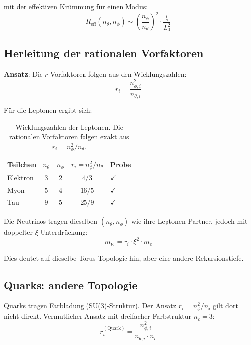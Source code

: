 mit der effektiven Krümmung für einen Modus:
\begin{equation}
    R_{\mathrm{eff}}(n_\theta, n_\phi)
    \sim \left(\frac{n_\phi}{n_\theta}\right)^2 \cdot \frac{\xi}{L_0^2}
\end{equation}

\subsection{Herleitung der rationalen Vorfaktoren}

\textbf{Ansatz}: Die $r$-Vorfaktoren folgen aus den Wicklungszahlen:
\begin{equation}
    \boxed{r_i = \frac{n_{\phi,i}^2}{n_{\theta,i}}}
    \label{eq:r_winding}
\end{equation}

Für die Leptonen ergibt sich:

\begin{table}[htbp]
\centering
\begin{tabular}{lcccl}
\toprule
\textbf{Teilchen} & $n_\theta$ & $n_\phi$ & $r_i = n_\phi^2/n_\theta$
& \textbf{Probe} \\
\midrule
Elektron & $3$ & $2$ & $4/3$  & $\checkmark$ \\
Myon     & $5$ & $4$ & $16/5$ & $\checkmark$ \\
Tau      & $9$ & $5$ & $25/9$ & $\checkmark$ \\
\bottomrule
\end{tabular}
\caption{Wicklungszahlen der Leptonen. Die rationalen Vorfaktoren folgen
exakt aus $r_i = n_\phi^2 / n_\theta$.}
\label{tab:leptonen_wicklung}
\end{table}

Die Neutrinos tragen dieselben $(n_\theta, n_\phi)$ wie ihre
Leptonen-Partner, jedoch mit doppelter $\xi$-Unterdrückung:
\begin{equation}
    m_{\nu_i} = r_i \cdot \xi^2 \cdot m_e
\end{equation}

Dies deutet auf dieselbe Torus-Topologie hin, aber eine andere
Rekursionstiefe.

\subsection{Quarks: andere Topologie}

Quarks tragen Farbladung (SU(3)-Struktur). Der Ansatz
$r_i = n_\phi^2 / n_\theta$ gilt dort nicht direkt. Vermutlicher
Ansatz mit dreifacher Farbstruktur $n_c = 3$:
\begin{equation}
    r_i^{(\mathrm{Quark})} = \frac{n_{\phi,i}^2}{n_{\theta,i} \cdot n_c}
\end{equation}

